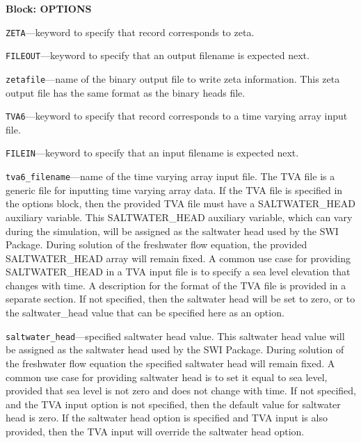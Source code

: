
\item \textbf{Block: OPTIONS}

\begin{description}
\item \texttt{ZETA}---keyword to specify that record corresponds to zeta.

\item \texttt{FILEOUT}---keyword to specify that an output filename is expected next.

\item \texttt{zetafile}---name of the binary output file to write zeta information.  This zeta output file has the same format as the binary heads file.

\item \texttt{TVA6}---keyword to specify that record corresponds to a time varying array input file.

\item \texttt{FILEIN}---keyword to specify that an input filename is expected next.

\item \texttt{tva6\_filename}---name of the time varying array input file.  The TVA file is a generic file for inputting time varying array data.  If the TVA file is specified in the options block, then the provided TVA file must have a SALTWATER\_HEAD auxiliary variable.  This SALTWATER\_HEAD auxiliary variable, which can vary during the simulation, will be assigned as the saltwater head used by the SWI Package. During solution of the freshwater flow equation, the provided SALTWATER\_HEAD array will remain fixed.  A common use case for providing SALTWATER\_HEAD in a TVA input file is to specify a sea level elevation that changes with time.  A description for the format of the TVA file is provided in a separate section.  If not specified, then the saltwater head will be set to zero, or to the saltwater\_head value that can be specified here as an option.

\item \texttt{saltwater\_head}---specified saltwater head value.  This saltwater head value will be assigned as the saltwater head used by the SWI Package. During solution of the freshwater flow equation the specified saltwater head will remain fixed.  A common use case for providing saltwater head is to set it equal to sea level, provided that sea level is not zero and does not change with time.  If not specified, and the TVA input option is not specified, then the default value for saltwater head is zero.  If the saltwater head option is specified and TVA input is also provided, then the TVA input will override the saltwater head option.

\end{description}

